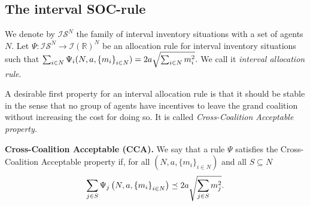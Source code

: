 \documentclass[12pt]{article}
\begin{document}
\subsection{The interval SOC-rule}

We denote by $\mathcal{IS}^{N}$ the family of interval inventory situations
with a set of agents $N$. Let $\Psi :\mathcal{IS}^{N}\rightarrow \mathcal{I}(%
\mathbb{R})^{N}$ be an allocation rule  for interval inventory
situations such that $\sum_{i\in N}\Psi _{i}(N,a,\left\{ m_{i}\right\} _{i\in N})=2a\sqrt{%
\sum_{i\in N}m_{i}^{2}}.$ We call it \textit{interval allocation rule}. 




\medskip

\noindent A desirable first property for an interval allocation rule is that it should be stable in the sense that no group of agents have incentives to leave the grand coalition without increasing the cost for doing so. It is called \textit{Cross-Coalition Acceptable property.}

\noindent \textbf{Cross-Coalition Acceptable (CCA).} We say that a rule $\Psi $
satisfies the Cross-Coalition Acceptable property if, for all $(N,a,\{ m_i\}
_{i\in N})$ and all $S\subseteq N$  
\begin{equation*}
\begin{split}
\sum_{j\in S}\Psi_j\left(N,a,\left\{ m_i\right\} _{i\in
N}\right)\preceq 2a\sqrt{%
\sum_{j\in S}m_{j}^{2}}.
\end{split}%
\end{equation*}%
\end{document}
